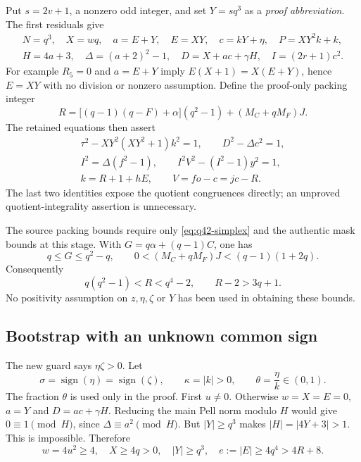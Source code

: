 Put $s=2v+1$, a nonzero odd integer, and set $Y=sq^3$ as a
\emph{proof abbreviation}. The first residuals give
\begin{gather*}
 N=q^3,\quad X=wq,\quad a=E+Y,\quad E=XY,\quad
 c=kY+\eta,\quad P=XY^2k+k,\\
 H=4a+3,\quad \Delta=(a+2)^2-1,\quad
 D=X+ac+\gamma H,\quad I=(2r+1)c^2.
\end{gather*}
For example $R_5=0$ and $a=E+Y$ imply
$E(X+1)=X(E+Y)$, hence $E=XY$ with no division or nonzero assumption.
Define the proof-only packing integer
\begin{equation}
 R=\bigl[(q-1)(q-F)+\alpha\bigr](q^2-1)
       +(M_C+qM_F)J.
 \label{eq:q42-packing}
\end{equation}
The retained equations then assert
\begin{gather}
 \tau^2-XY^2(XY^2+1)k^2=1,
 \qquad D^2-\Delta c^2=1, \label{eq:q42-pell1}\\
 I^2=\Delta(f^2-1),
 \qquad I^2V^2-(I^2-1)y^2=1, \label{eq:q42-pell2}\\
 k=R+1+hE,
 \qquad V=fo-c=jc-R. \label{eq:q42-index}
\end{gather}
The last two identities expose the quotient congruences directly; an
unproved quotient-integrality assertion is unnecessary.

The source packing bounds require only \eqref{eq:q42-simplex} and the
authentic mask bounds at this stage. With
$G=q\alpha+(q-1)C$, one has
\[
 q\le G\le q^2-q,
 \qquad 0<(M_C+qM_F)J<(q-1)(1+2q).
\]
Consequently
\begin{equation}
 q(q^2-1)<R<q^4-2,
 \qquad R-2>3q+1.
 \label{eq:q42-rbounds}
\end{equation}
No positivity assumption on $z,\eta,\zeta$ or $Y$ has been used in
obtaining these bounds.

\subsection{Bootstrap with an unknown common sign}

The new guard says $\eta\zeta>0$. Let
\[
 \sigma=\operatorname{sign}(\eta)=\operatorname{sign}(\zeta),
 \qquad \kappa=|k|>0,
 \qquad \theta=\frac{\eta}{k}\in(0,1).
\]
The fraction $\theta$ is used only in the proof. First $u\ne0$.
Otherwise $w=X=E=0$, $a=Y$ and $D=ac+\gamma H$. Reducing the main
Pell norm modulo $H$ would give $0\equiv1\pmod H$, since
$\Delta\equiv a^2\pmod H$. But $|Y|\ge q^3$ makes
$|H|=|4Y+3|>1$. This is impossible. Therefore
\begin{equation}
 w=4u^2\ge4,\quad X\ge4q>0,\quad |Y|\ge q^3,
 \quad e:=|E|\ge4q^4>4R+8.
 \label{eq:q42-modulus}
\end{equation}

